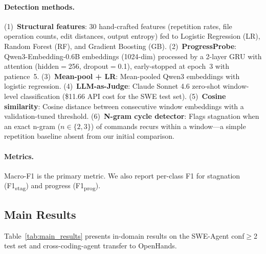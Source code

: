 \paragraph{Detection methods.}
(1)~\textbf{Structural features}: 30 hand-crafted features (repetition rates, file operation counts, edit distances, output entropy) fed to Logistic Regression (LR), Random Forest (RF), and Gradient Boosting (GB).
(2)~\textbf{ProgressProbe}: Qwen3-Embedding-0.6B \citep{zhang2025qwen3embedding} embeddings (1024-dim) processed by a 2-layer GRU \citep{cho2014gru} with attention \citep{bahdanau2015attention} (hidden$=$256, dropout$=$0.1), early-stopped at epoch~3 with patience~5.
(3)~\textbf{Mean-pool + LR}: Mean-pooled Qwen3 embeddings with logistic regression.
(4)~\textbf{LLM-as-Judge}: Claude Sonnet 4.6 zero-shot window-level classification (\$11.66 API cost for the SWE test set).
(5)~\textbf{Cosine similarity}: Cosine distance between consecutive window embeddings with a validation-tuned threshold.
(6)~\textbf{N-gram cycle detector}: Flags stagnation when an exact n-gram ($n \in \{2,3\}$) of commands recurs within a window---a simple repetition baseline absent from our initial comparison.

\paragraph{Metrics.}
Macro-F1 is the primary metric. We also report per-class F1 for stagnation (F1\textsubscript{stag}) and progress (F1\textsubscript{prog}).

\subsection{Main Results}
\label{sec:main_results}

Table~\ref{tab:main_results} presents in-domain results on the SWE-Agent conf${\geq}$2 test set and cross-coding-agent transfer to OpenHands.

